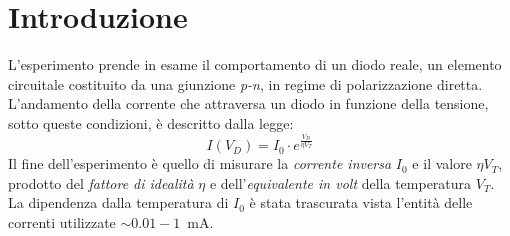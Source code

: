 \documentclass[@SRC@/main]{subfiles}
\begin{document}
\section{Introduzione} \label{sec:introduzione}
  L'esperimento prende in esame il comportamento di un diodo reale, un elemento circuitale
  costituito da una giunzione \textit{p-n}, in regime di polarizzazione diretta.
  L'andamento della corrente che attraversa un diodo in funzione della tensione,
  sotto queste condizioni, è descritto dalla legge:
  \begin{equation}
    \label{eq:caratteristiche}
    I(V_D) = I_0\cdot e^{\frac{V_D}{\eta V_T}}
  \end{equation}
  Il fine dell'esperimento è quello di misurare la \textit{corrente inversa} $I_0$ e il
  valore $\eta V_T$, prodotto del \textit{fattore di idealità} $\eta$ e
  dell'\textit{equivalente in volt} della temperatura $V_T$.
  La dipendenza dalla temperatura di $I_0$ è stata trascurata vista l'entità
  delle correnti utilizzate $\sim 0.01-1$~mA.
\end{document}
